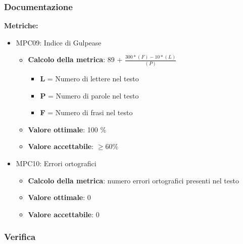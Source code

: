 \documentclass[12pt]{article}
\begin{document}
\subsubsection{Documentazione}
\textbf{Metriche:}
\begin{itemize}
	\item MPC09: Indice di Gulpease
	      \begin{itemize}
		      \item \textbf{Calcolo della metrica}:  89 + $\frac{300*(F) - 10 * (L)}{(P)}$
		            \begin{itemize}
			            \item \textbf{L} = Numero di lettere nel testo
			            \item \textbf{P} = Numero di parole nel testo
			            \item \textbf{F} = Numero di frasi nel testo
		            \end{itemize}
		      \item \textbf{Valore ottimale}: 100 \%
		      \item \textbf{Valore accettabile}: $\ge 60\%$
	      \end{itemize}
\end{itemize}
\begin{itemize}
	\item MPC10: Errori ortografici
	      \begin{itemize}
		      \item \textbf{Calcolo della metrica}: numero errori ortografici presenti nel testo
		      \item \textbf{Valore ottimale}: 0
		      \item \textbf{Valore accettabile}: 0
	      \end{itemize}
\end{itemize}

\subsubsection{Verifica}
\end{document}
